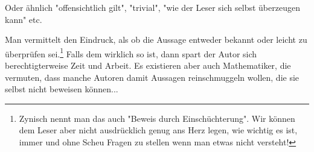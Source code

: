 \begin{shadedbox}
\begin{itemize}
        Oder ähnlich "offensichtlich gilt", "trivial", "wie der Leser sich selbst überzeugen kann" etc.

        Man vermittelt den Eindruck, als ob die Aussage entweder bekannt oder leicht zu überprüfen sei.\footnote{Zynisch nennt man das auch "Beweis durch Einschüchterung". Wir können dem Leser aber nicht ausdrücklich genug ans Herz legen, wie wichtig es ist, immer und ohne Scheu Fragen zu stellen wenn man etwas nicht versteht!} Falls dem wirklich so ist, dann spart der Autor sich berechtigterweise Zeit und Arbeit. Es existieren aber auch Mathematiker, die vermuten, dass manche Autoren damit Aussagen reinschmuggeln wollen, die sie selbst nicht beweisen können...
    \end{itemize}
\end{shadedbox}


\cite{GURAU}

